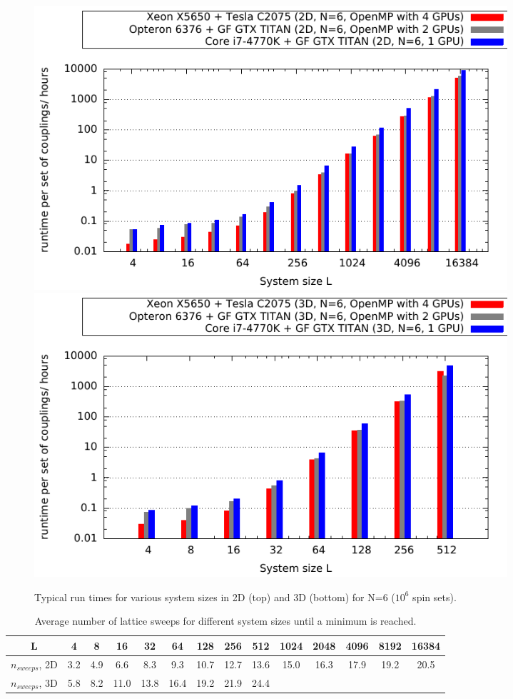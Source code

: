 \documentclass[paper=a4, fontsize=11pt]{scrartcl} %
\numberwithin{equation}{section} %
\numberwithin{figure}{section} %
\numberwithin{table}{section} %
\begin{document}
\begin{figure}
\centering
\includegraphics[width=0.85\textwidth]{images/perf_time2d.pdf}
\includegraphics[width=0.85\textwidth]{images/perf_time3d.pdf}
\caption{Typical run times for various system sizes in 2D (top) and 3D (bottom) for N=6 ($10^6$ spin sets).}
\label{fig:perf_times}
\end{figure}

\begin{table}
\centering
  \begin{tabular}{| c | c | c | c | c | c | c | c | c | c | c | c | c | c |}
    \hline
    L & 4 & 8 & 16 & 32 & 64 & 128 & 256 & 512 & 1024 & 2048 & 4096 & 8192 & 16384 \\ \hline
	$n_{sweeps}$, 2D & 3.2 & 4.9 &  6.6 &  8.3 &  9.3 & 10.7 & 12.7 & 13.6 & 15.0 & 16.3 & 17.9 & 19.2 & 20.5 \\ \hline
	$n_{sweeps}$, 3D & 5.8 & 8.2 & 11.0 & 13.8 & 16.4 & 19.2 & 21.9 & 24.4 &      &      &      &      &      \\ \hline
  \end{tabular}
  \caption{Average number of lattice sweeps for different system sizes until a minimum is reached.}
  \label{tab:avg_sweeps}
\end{table}
\end{document}
